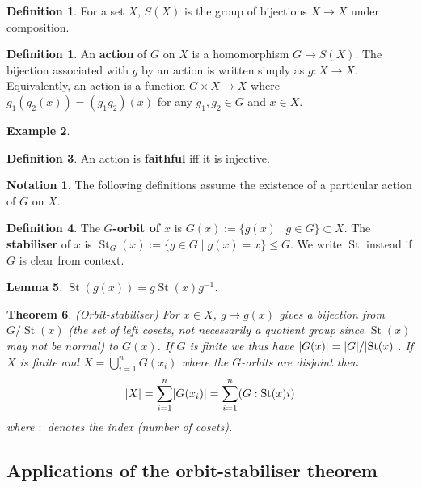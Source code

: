 \documentclass[12pt]{article}
\newtheorem{thm}{Theorem}[section]
\newtheorem{lem}[thm]{Lemma}
\theoremstyle{definition}
\newtheorem{defn}[thm]{Definition}
\newtheorem*{defn*}{Definition}
\newtheorem*{not*}{Notation}
\newtheorem{exm}[thm]{Example}
\DeclarePairedDelimiter\abs{\lvert}{\rvert}
\DeclareMathOperator{\St}{St}
\begin{document}
\begin{defn*}
  For a set $X$, $S(X)$ is the group of bijections $X \to X$ under composition.
\end{defn*}

\begin{defn}
  An \textbf{action} of $G$ on $X$ is a homomorphism $G \to S(X)$.
  The bijection associated with $g$ by an action is written simply as $g : X \to X$.
  Equivalently, an action is a function $G \times X \to X$ where $g_1(g_2(x)) = (g_1g_2)(x)$ for any $g_1, g_2 \in G$ and $x \in X$.
\end{defn}

\begin{exm}
\end{exm}

\begin{defn}
  An action is \textbf{faithful} iff it is injective.
\end{defn}

\begin{not*}
  The following definitions assume the existence of a particular action of $G$ on $X$.
\end{not*}

\begin{defn}
  The \textbf{$G$-orbit of $x$} is $G(x) := \{ g(x) \mid g \in G \} \subset X$.
  The \textbf{stabiliser} of $x$ is $\St_G(x) := \{ g \in G \mid g(x) = x \} \leq G$.
  We write $\St$ instead if $G$ is clear from context.
\end{defn}

\begin{lem}
  $\St(g(x)) = g\St(x)g^{-1}$.
\end{lem}

\begin{thm}
  (Orbit-stabiliser)
  For $x \in X$, $g \mapsto g(x)$ gives a bijection from $G / \St(x)$ (the set of left cosets, not necessarily a quotient group since $\St(x)$ may not be normal) to $G(x)$.
  If $G$ is finite we thus have $\abs{G(x)} = \abs{G} / \abs{\St(x)}$.
  If $X$ is finite and $X = \bigcup_{i = 1}^nG(x_i)$ where the $G$-orbits are disjoint then
  $$\abs{X} = \sum_{i = 1}^n\abs{G(x_i)} = \sum_{i = 1}^n(G : \St(x)i)$$
  where $:$ denotes the index (number of cosets).
\end{thm}

\subsection{Applications of the orbit-stabiliser theorem}
\end{document}
